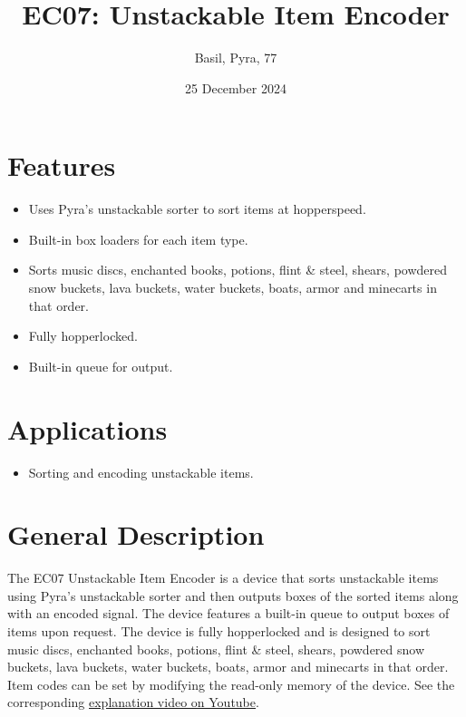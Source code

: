 \documentclass[10pt]{datasheet}
\title{EC07: Unstackable Item Encoder}
\author{Basil, Pyra, 77}
\date{25 December 2024}
\begin{document}
\maketitle

\section{Features}

\begin{itemize}
\item{Uses Pyra's unstackable sorter to sort items at hopperspeed.}
\item{Built-in box loaders for each item type.}
\item{Sorts music discs, enchanted books, potions, flint \& steel, shears, powdered snow buckets, lava buckets, water buckets, boats, armor and minecarts in that order.}
\item{Fully hopperlocked.}
\item{Built-in queue for output.}
\end{itemize}

\section{Applications}

\begin{itemize}
\item{Sorting and encoding unstackable items.}
\end{itemize}

\section{General Description}
The EC07 Unstackable Item Encoder is a device that sorts unstackable items using Pyra's unstackable sorter and then outputs boxes of the sorted items along with an encoded signal. The device features a built-in queue to output boxes of items upon request. The device is fully hopperlocked and is designed to sort music discs, enchanted books, potions, flint \& steel, shears, powdered snow buckets, lava buckets, water buckets, boats, armor and minecarts in that order. Item codes can be set by modifying the read-only memory of the device. See the corresponding \href{https://www.youtube.com/watch?v=1yDuKrriiYI}{explanation video on Youtube}.
\vfill\break
\end{document}
